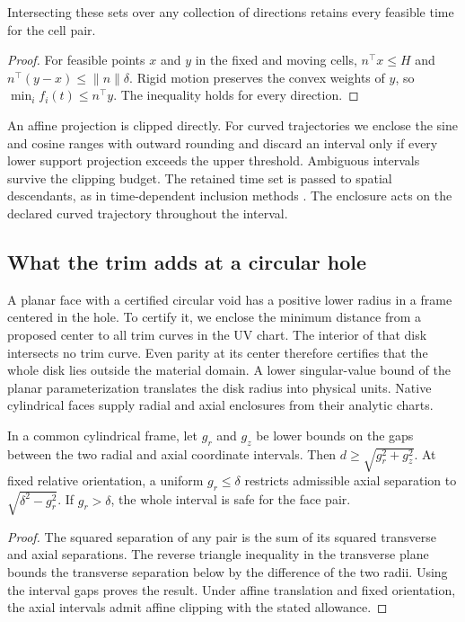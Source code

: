 \begin{proposition}
Intersecting these sets over any collection of directions retains every
feasible time for the cell pair.
\end{proposition}
\begin{proof}
For feasible points \(x\) and \(y\) in the fixed and moving cells,
\(n^\top x\le H\) and \(n^\top(y-x)\le\|n\|\delta\).
Rigid motion preserves the convex weights of \(y\), so
\(\min_i f_i(t)\le n^\top y\). The inequality holds for every direction.
\end{proof}

An affine projection is clipped directly. For curved trajectories we
enclose the sine and cosine ranges with outward rounding and discard an
interval only if every lower support projection exceeds the upper
threshold. Ambiguous intervals survive the clipping budget. The retained
time set is passed to spatial descendants, as in time-dependent
inclusion methods \cite{chen2024}. The enclosure acts on the declared
curved trajectory throughout the interval.

\subsection{What the trim adds at a circular hole}

A planar face with a certified circular void has a positive lower radius
in a frame centered in the hole. To certify it, we enclose the minimum
distance from a proposed center to all trim curves in the UV chart.
The interior of that disk intersects no trim curve. Even parity at its
center therefore certifies that the whole disk lies outside the material
domain. A lower singular-value bound of the planar parameterization
translates the disk radius into physical units. Native cylindrical
faces supply radial and axial enclosures from their analytic charts.

\begin{proposition}
In a common cylindrical frame, let \(g_r\) and \(g_z\) be lower bounds
on the gaps between the two radial and axial coordinate intervals.
Then \(d\ge\sqrt{g_r^2+g_z^2}\). At fixed relative orientation, a
uniform \(g_r\le\delta\) restricts admissible axial separation to
\(\sqrt{\delta^2-g_r^2}\). If \(g_r>\delta\), the whole interval is safe
for the face pair.
\end{proposition}
\begin{proof}
The squared separation of any pair is the sum of its squared transverse
and axial separations. The reverse triangle inequality in the transverse
plane bounds the transverse separation below by the difference of the
two radii. Using the interval gaps proves the result. Under affine
translation and fixed orientation, the axial intervals admit affine
clipping with the stated allowance.
\end{proof}

